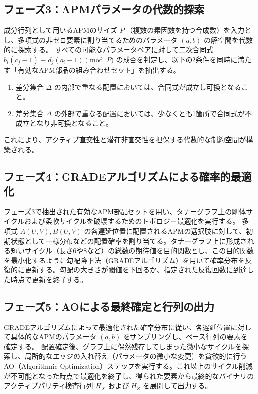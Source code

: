 \documentclass[12pt]{article}
\begin{document}
\subsection{フェーズ3：APMパラメータの代数的探索}
成分行列として用いるAPMのサイズ $P$ （複数の素因数を持つ合成数）を入力とし、多項式の非ゼロ要素に割り当てるためのパラメータ $(a, b)$ の解空間を代数的に探索する。
すべての可能なパラメータペアに対して二次合同式 $b_i (c_j - 1) \equiv d_j (a_i - 1) \pmod P$ の成否を判定し、以下の2条件を同時に満たす「有効なAPM部品の組み合わせセット」を抽出する。
\begin{enumerate}
    \item 差分集合 $\Delta$ の内部で重なる配置においては、合同式が成立し可換となること。
    \item 差分集合 $\Delta$ の外部で重なる配置においては、少なくとも1箇所で合同式が不成立となり非可換となること。
\end{enumerate}
これにより、アクティブ直交性と潜在非直交性を担保する代数的な制約空間が構築される。

\subsection{フェーズ4：GRADEアルゴリズムによる確率的最適化}
フェーズ3で抽出された有効なAPM部品セットを用い、タナーグラフ上の剛体サイクルおよび柔軟サイクルを破壊するためのトポロジー最適化を実行する。
多項式 $A(U,V), B(U,V)$ の各遅延位置に配置されるAPMの選択肢に対して、初期状態として一様分布などの配置確率を割り当てる。タナーグラフ上に形成される短いサイクル（長さ6や8など）の総数の期待値を目的関数とし、この目的関数を最小化するように勾配降下法（GRADEアルゴリズム）を用いて確率分布を反復的に更新する。勾配の大きさが閾値を下回るか、指定された反復回数に到達した時点で更新を終了する。

\subsection{フェーズ5：AOによる最終確定と行列の出力}
GRADEアルゴリズムによって最適化された確率分布に従い、各遅延位置に対して具体的なAPMのパラメータ $(a, b)$ をサンプリングし、ベース行列の要素を確定する。
配置確定後、グラフ上に偶然残存してしまった微小なサイクルを探索し、局所的なエッジの入れ替え（パラメータの微小な変更）を貪欲的に行うAO（Algorithmic Optimization）ステップを実行する。これ以上のサイクル削減が不可能となった時点で最適化を終了し、得られた要素から最終的なバイナリのアクティブパリティ検査行列 $H_X$ および $H_Z$ を展開して出力する。
\end{document}
